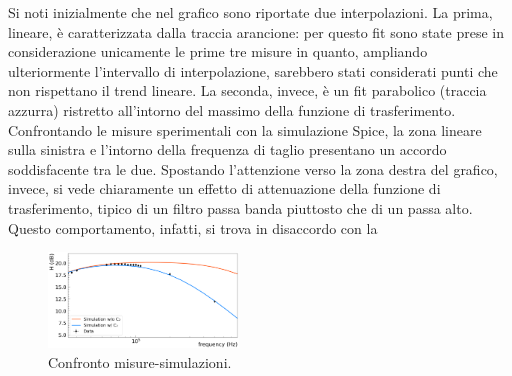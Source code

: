 \documentclass[a4paper,11pt]{article} %
\begin{document}
\noindent Si noti inizialmente che nel grafico sono riportate due interpolazioni. La prima, lineare, è caratterizzata
dalla traccia arancione: per questo fit sono state prese in considerazione unicamente le prime tre misure in quanto,
ampliando ulteriormente l'intervallo di interpolazione, sarebbero stati considerati punti che non rispettano il trend
lineare. La seconda, invece, è un fit parabolico (traccia azzurra) ristretto all'intorno del massimo della funzione di
trasferimento. Confrontando le misure sperimentali con la simulazione Spice, la zona lineare sulla sinistra e l'intorno
della frequenza di taglio presentano un accordo soddisfacente tra le due. Spostando l'attenzione verso la zona destra
del grafico, invece, si vede chiaramente un effetto di attenuazione della funzione di trasferimento, tipico di un filtro
passa banda piuttosto che di un passa alto. Questo comportamento, infatti, si trova in disaccordo con la 

	\begin{figure}
		\centering
		\includegraphics[width=0.45\textwidth]{../Plots/Report_Plots/diff_sim_comp.png}
		\caption{\small Confronto misure-simulazioni.}
		\label{i:diff_sim_comp}
	\end{figure}
	
\end{document}
